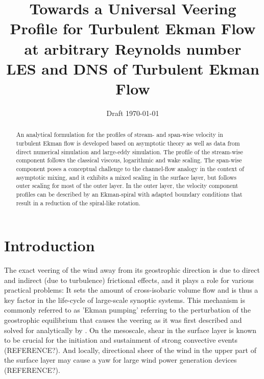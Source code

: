 \documentclass[a4paper,11pt]{article}
\date{Draft \today}
\title{Towards a Universal Veering Profile for Turbulent Ekman Flow at arbitrary Reynolds number \\
  \normalsize LES and DNS of Turbulent Ekman Flow \\}
\begin{document}
 

\maketitle

\begin{abstract}
  An analytical formulation for the profiles of stream- and span-wise velocity in turbulent Ekman flow
  is developed based on asymptotic theory as well as data from direct numerical simulation and large-eddy simulation.
  The profile of the stream-wise component follows the classical viscous, logarithmic and wake scaling.
  The span-wise component poses a conceptual challenge to the channel-flow analogy
  in the context of asymptotic mixing, and it exhibits a mixed scaling in the surface layer, but follows
  outer scaling for most of the outer layer.
  In the outer layer, the velocity component profiles can be described by an Ekman-spiral with adapted
  boundary conditions that result in a reduction of the spiral-like rotation. 
\end{abstract}
%
%
\section{Introduction}

The exact veering of the wind away from its geostrophic direction is due to direct and indirect (due to turbulence) frictional effects,
and it plays a role for various practical problems: 
%
It sets the amount of cross-isobaric volume flow and is thus a key factor in the life-cycle of large-scale synoptic systems. This mechanism is commonly
referred to as 'Ekman pumping' referring to the perturbation of the geostrophic equilibrium that causes the veering as it was first described
and solved for analytically by \cite{Ekman:1905tl}.
%
On the mesoscale, shear in the surface layer is known to be crucial for the initiation and sustainment of strong convective events (REFERENCE?).
% 
And locally, directional sheer of the wind in the upper part of the surface layer may cause a yaw for large wind power generation devices (REFERENCE?).
\end{document}
